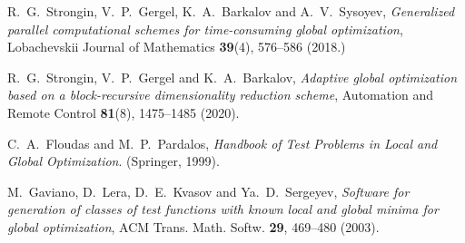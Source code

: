 \documentclass[
11pt,%
tightenlines,%
twoside,%
onecolumn,%
nofloats,%
nobibnotes,%
nofootinbib,%
superscriptaddress,%
noshowpacs,%
centertags]%
{revtex4}
\begin{document}
\begin{thebibliography}{99}
R.~G.~Strongin, V.~P.~Gergel, K.~A.~Barkalov and A.~V.~Sysoyev, \textit{Generalized parallel computational schemes for time-consuming global optimization}, Lobachevskii Journal of Mathematics \textbf{39}(4), 576--586 (2018.)

R.~G.~Strongin, V.~P.~Gergel and K.~A.~Barkalov, \textit{Adaptive global optimization based on a block-recursive dimensionality reduction scheme}, Automation and Remote Control \textbf{81}(8), 1475--1485 (2020).

C.~A.~Floudas and M.~P.~Pardalos,  \textit{Handbook of Test Problems in Local and Global Optimization}. (Springer, 1999).  %

M.~Gaviano, D.~Lera, D.~E.~Kvasov and Ya.~D.~Sergeyev, \textit{Software for generation of classes of test functions with known local and global minima for global optimization}, ACM Trans. Math. Softw. \textbf{29}, 469--480 (2003).



\end{thebibliography}
\end{document}
